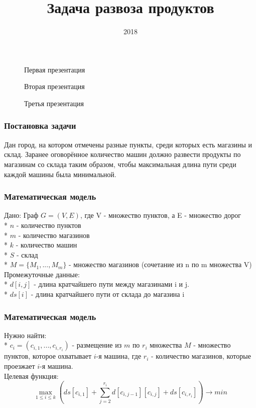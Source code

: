 \documentclass{beamer}
\title{Задача развоза продуктов}
\date{2018}
\begin{document}
\frame{\titlepage}
\begin{frame}
    \begin{figure}
        \centering
        Первая презентация
    \end{figure}
\end{frame}

\begin{frame}
    \begin{figure}
        Вторая презентация
    \end{figure}
\end{frame}

\begin{frame}
    \begin{figure}
        Третья презентация
    \end{figure}
\end{frame}
\begin{frame}
    \frametitle{Постановка задачи}
    Дан город, на котором отмечены разные пункты, среди которых есть магазины и склад.
    Заранее оговорённое количество машин должно развести продукты по магазинам со склада
    таким образом, чтобы максимальная длина пути среди каждой машины была минимальной.
\end{frame}
\begin{frame}
    \frametitle{Математическая модель}
    Дано:
    Граф \( G = (V, E) \), где V - множество пунктов, а E - 
    множество дорог\\*
    \(n\) - количество пунктов\\*
    \(m\) - количество магазинов\\*
    \(k\) - количество машин\\*
    \(S\) - склад\\*
    \(M = \{M_1, ..., M_m\}\) - множество магазинов (сочетание из n 
    по m множества V)\\
    Промежуточные данные:\\*
    \(d[i, j]\) - длина кратчайшего пути между магазинами i и j.\\*
    \(ds[i]\) - длина кратчайшего пути от склада до магазина i
\end{frame}
\begin{frame}
    \frametitle{Математическая модель}
    Нужно найти:\\*
    \(c_i = (c_{i,1}, ..., c_{i,r_i})\) - размещение 
    из \(m\) по \(r_i\) множества \(M\) - множество пунктов,
    которое охватывает \(i\)-я машина, где \(r_i\) - количество магазинов, которые проезжает \(i\)-я машина.\\
    Целевая функция:
    \[\max_{1 \leq i \leq k} \left(ds[c_{i,1}] + \sum\limits_{j = 2}^{r_i}d[c_{i,j-1}][c_{i,j}] + ds[c_{i,r_i}]\right) \longrightarrow min \]
\end{frame}
\end{document}
